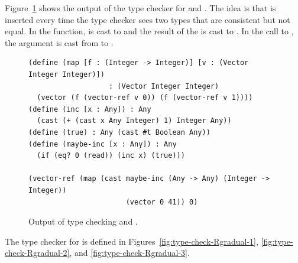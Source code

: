 \documentclass[7x10,nocrop]{TimesAPriori_MIT}%
\begin{document}
Figure~\ref{fig:map-cast} shows the output of the type checker for
 and .  The idea is that  is
inserted every time the type checker sees two types that are
consistent but not equal. In the  function,  is
cast to  and the result of the \code{+} is cast to
.  In the call to , the  argument
is cast from  to .

\begin{figure}[btp]
\begin{lstlisting}[basicstyle=\ttfamily\footnotesize]
(define (map [f : (Integer -> Integer)] [v : (Vector Integer Integer)])
                   : (Vector Integer Integer)
  (vector (f (vector-ref v 0)) (f (vector-ref v 1))))
(define (inc [x : Any]) : Any
  (cast (+ (cast x Any Integer) 1) Integer Any))
(define (true) : Any (cast #t Boolean Any))
(define (maybe-inc [x : Any]) : Any
  (if (eq? 0 (read)) (inc x) (true)))

(vector-ref (map (cast maybe-inc (Any -> Any) (Integer -> Integer))
                       (vector 0 41)) 0)
\end{lstlisting}
\caption{Output of type checking 
  and .}
\label{fig:map-cast}
\end{figure}


The type checker for \LangGrad{} is defined in
Figures~\ref{fig:type-check-Rgradual-1}, \ref{fig:type-check-Rgradual-2},
and \ref{fig:type-check-Rgradual-3}.
\end{document}
